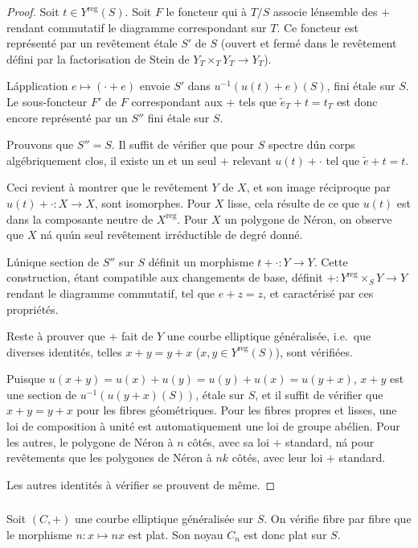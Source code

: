 \documentclass{amsart}
\theoremstyle{plain}
\theoremstyle{remark}
\begin{document}
\begin{proof}
Soit $t \in Y^{\mathrm{reg}}(S)$. Soit $F$ le foncteur qui \`a $T/S$ associe l\'ensemble des $+$
rendant commutatif le diagramme correspondant sur $T$. Ce foncteur est
repr\'esent\'e par un rev\^etement \'etale $S'$ de $S$ (ouvert et ferm\'e dans le
rev\^etement d\'efini par la factorisation de Stein de $Y_T \times_T Y_T \to Y_T$).

L\'application $e \mapsto (\cdot + e)$ envoie $S'$ dans $u^{-1}(u(t)+e)(S)$, fini \'etale
sur $S$. Le sous-foncteur $F'$ de $F$ correspondant aux $+$ tels que
$\widetilde{e}_T + t = t_T$ est donc encore repr\'esent\'e par un $S''$ fini \'etale sur $S$.

Prouvons que $S'' = S$. Il suffit de v\'erifier que pour $S$ spectre d\'un corps
alg\'ebriquement clos, il existe un et un seul $+$ relevant $u(t)+\cdot$ tel que
$\widetilde{e} + t = t$.

Ceci revient \`a montrer que le rev\^etement $Y$ de $X$, et son image r\'eciproque
par $u(t)+\cdot: X \to X$, sont isomorphes. Pour $X$ lisse, cela r\'esulte de ce que
$u(t)$ est dans la composante neutre de $X^{\mathrm{reg}}$. Pour $X$ un polygone de N\'eron, on
observe que $X$ n\'a qu\'un seul rev\^etement irr\'eductible de degr\'e donn\'e.

L\'unique section de $S''$ sur $S$ d\'efinit un morphisme $t+\cdot: Y \to Y$. Cette
construction, \'etant compatible aux changements de base, d\'efinit
$+: Y^{\mathrm{reg}} \times_S Y \to Y$ rendant le diagramme commutatif, tel que $e+z = z$,
et caract\'eris\'e par ces propri\'et\'es.

Reste \`a prouver que $+$ fait de $Y$ une courbe elliptique g\'en\'eralis\'ee, i.e.~que
diverses identit\'es, telles $x+y = y+x$ ($x, y \in Y^{\mathrm{reg}}(S)$), sont v\'erifi\'ees.

Puisque $u(x+y) = u(x)+u(y) = u(y)+u(x) = u(y+x)$, $x+y$ est une section de
$u^{-1}(u(y+x)(S))$, \'etale sur $S$, et il suffit de v\'erifier que $x+y = y+x$ pour
les fibres g\'eom\'etriques. Pour les fibres propres et lisses, une loi de composition \`a
unit\'e est automatiquement une loi de groupe ab\'elien. Pour les autres, le polygone de
N\'eron \`a $n$ c\^ot\'es, avec sa loi $+$ standard, n\'a pour rev\^etements que les
polygones de N\'eron \`a $nk$ c\^ot\'es, avec leur loi $+$ standard.

Les autres identit\'es \`a v\'erifier se prouvent de m\^eme.
\end{proof}

\subsubsection{}
Soit $(C,+)$ une courbe elliptique g\'en\'eralis\'ee sur $S$. On v\'erifie fibre par fibre
que le morphisme $n: x \mapsto nx$ est plat. Son noyau $C_n$ est donc plat sur $S$.
\end{document}
